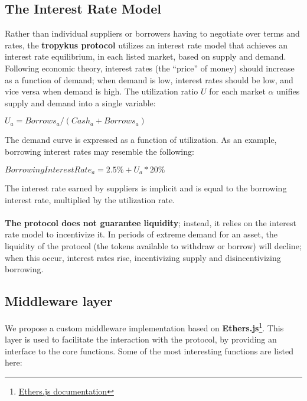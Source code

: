 \documentclass{article}
\begin{document}
\subsection{The Interest Rate Model}
Rather than individual suppliers or borrowers having to negotiate over terms and rates, the \textbf{tropykus protocol} utilizes an interest rate model that achieves an interest rate equilibrium, in each listed market, based on supply and demand. Following economic theory, interest rates (the “price” of money) should increase as a function of demand; when demand is low, interest rates should be low, and vice versa when demand is high. The utilization ratio \textbf{$U$} for each market \textbf{$\alpha$} unifies supply and demand into a single variable:
\begin{center}
$U_{a} = Borrows_{a} / (Cash_{a} + Borrows_{a})$
\end{center}
The demand curve is expressed as a function of utilization. As an example, borrowing interest rates may resemble the following:
\begin{center}
$Borrowing Interest Rate_{a}= 2.5\% + U_{a} * 20\%$
\end{center}
The interest rate earned by suppliers is implicit and is equal to the borrowing interest rate,
multiplied by the utilization rate.
\\ \\
\textbf{The protocol does not guarantee liquidity}; instead, it relies on the interest rate model to incentivize it. In periods of extreme demand for an asset, the liquidity of the protocol (the tokens available to withdraw or borrow) will decline; when this occur, interest rates rise, incentivizing supply and disincentivizing borrowing.

\subsection{Middleware layer}
We propose a custom middleware implementation based on \textbf{Ethers.js}\footnote{\href{https://ethers.io}{Ethers.js documentation}}. This layer is used to facilitate the interaction with the protocol, by providing an interface to the core functions. Some of the most interesting functions are listed here: \\
\end{document}

